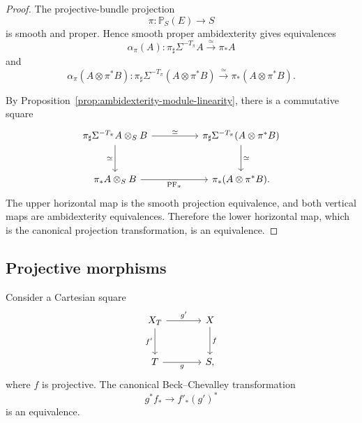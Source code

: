\begin{proof}
The projective-bundle projection
\[
    \pi:\mathbb P_S(E)\longrightarrow S
\]
is smooth and proper.  Hence smooth proper ambidexterity gives equivalences
\[
    \alpha_\pi(A):
    \pi_\sharp\Sigma^{-T_\pi}A
    \xrightarrow{\simeq}
    \pi_*A
\]
and
\[
    \alpha_\pi(A\otimes\pi^*B):
    \pi_\sharp
    \Sigma^{-T_\pi}
    (A\otimes\pi^*B)
    \xrightarrow{\simeq}
    \pi_*(A\otimes\pi^*B).
\]

By
Proposition~\ref{prop:ambidexterity-module-linearity},
there is a commutative square
\[
\begin{tikzcd}[column sep=huge,row sep=large]
    \pi_\sharp\Sigma^{-T_\pi}A\otimes_SB
        \arrow[r,"\simeq"]
        \arrow[d,"\simeq"']
        &
    \pi_\sharp
    \Sigma^{-T_\pi}
    (A\otimes\pi^*B)
        \arrow[d,"\simeq"]
    \\
    \pi_*A\otimes_SB
        \arrow[r,"\operatorname{PF}_\pi"']
        &
    \pi_*(A\otimes\pi^*B).
\end{tikzcd}
\]
The upper horizontal map is the smooth projection equivalence, and both
vertical maps are ambidexterity equivalences.  Therefore the lower
horizontal map, which is the canonical projection transformation, is an
equivalence.
\end{proof}

\subsection{Projective morphisms}

\begin{theorem}
\label{thm:projective-base-change}
Consider a Cartesian square
\[
\begin{tikzcd}[column sep=large,row sep=large]
    X_T \arrow[r,"g'"] \arrow[d,"f'"']
        & X \arrow[d,"f"] \\
    T \arrow[r,"g"'] & S,
\end{tikzcd}
\]
where \(f\) is projective.  The canonical Beck--Chevalley transformation
\[
    g^*f_*
    \longrightarrow
    f'_*(g')^*
\]
is an equivalence.
\end{theorem}

